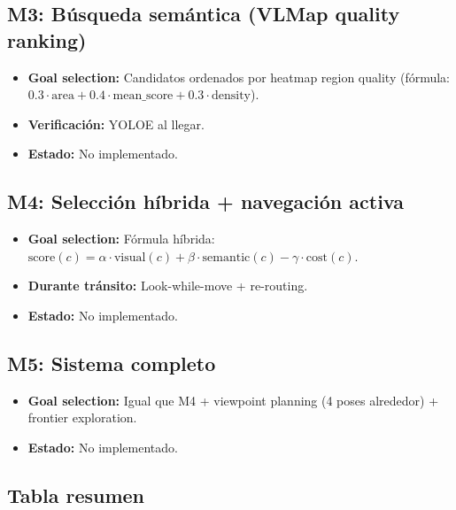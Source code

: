 \documentclass[11pt,a4paper]{article}
\begin{document}
\subsection{M3: Búsqueda semántica (VLMap quality ranking)}
\begin{itemize}
    \item \textbf{Goal selection:} Candidatos ordenados por heatmap region quality (fórmula: $0.3 \cdot \text{area} + 0.4 \cdot \text{mean\_score} + 0.3 \cdot \text{density}$).
    \item \textbf{Verificación:} YOLOE al llegar.
    \item \textbf{Estado:} \textcolor{notdone}{No implementado.}
\end{itemize}

\subsection{M4: Selección híbrida + navegación activa}
\begin{itemize}
    \item \textbf{Goal selection:} Fórmula híbrida: $\text{score}(c) = \alpha \cdot \text{visual}(c) + \beta \cdot \text{semantic}(c) - \gamma \cdot \text{cost}(c)$.
    \item \textbf{Durante tránsito:} Look-while-move + re-routing.
    \item \textbf{Estado:} \textcolor{notdone}{No implementado.}
\end{itemize}

\subsection{M5: Sistema completo}
\begin{itemize}
    \item \textbf{Goal selection:} Igual que M4 + viewpoint planning (4 poses alrededor) + frontier exploration.
    \item \textbf{Estado:} \textcolor{notdone}{No implementado.}
\end{itemize}

\subsection{Tabla resumen}
\end{document}
